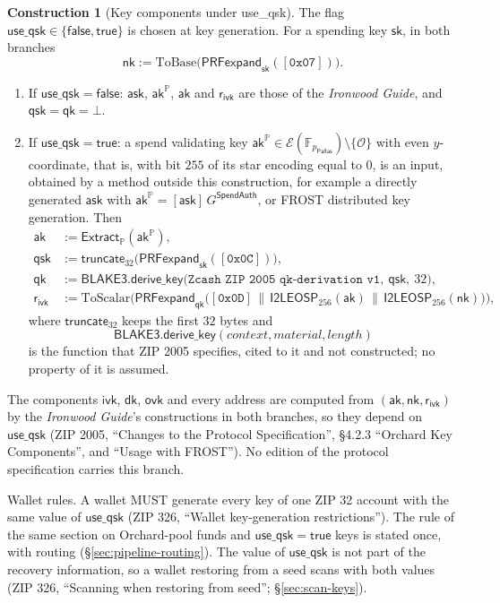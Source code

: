 \documentclass[11pt,a4paper]{article}
\theoremstyle{definition}
\newtheorem{construction}[theorem]{Construction}
\newcommand{\F}{\mathbb{F}}
\newcommand{\PP}{\mathbb{P}}
\newcommand{\Pallas}{\ensuremath{\mathsf{Pallas}}}
\newcommand{\Ep}{\ensuremath{\mathcal{E}}}
\newcommand{\Extract}{\ensuremath{\mathsf{Extract}}}
\newcommand{\ask}{\ensuremath{\mathsf{ask}}}
\newcommand{\aksym}{\ensuremath{\mathsf{ak}}}
\newcommand{\nksym}{\ensuremath{\mathsf{nk}}}
\newcommand{\ivk}{\ensuremath{\mathsf{ivk}}}
\newcommand{\ovk}{\ensuremath{\mathsf{ovk}}}
\newcommand{\dk}{\ensuremath{\mathsf{dk}}}
\newcommand{\rivk}{\ensuremath{\mathsf{r_{ivk}}}}
\begin{document}
\begin{construction}[Key components under use\_qsk]\label{def:zip32-useqsk}
The flag $\mathsf{use\_qsk} \in \{\mathsf{false}, \mathsf{true}\}$ is chosen
at key generation. For a spending key $\mathsf{sk}$, in both branches
\[
  \nksym := \mathrm{ToBase}\bigl(\mathsf{PRFexpand}_{\mathsf{sk}}
    ([\mathtt{0x07}])\bigr).
\]
\begin{enumerate}
\item If $\mathsf{use\_qsk} = \mathsf{false}$: $\ask$, $\aksym^{\PP}$,
  $\aksym$ and $\rivk$ are those of the \emph{Ironwood Guide}, and
  $\mathsf{qsk} = \mathsf{qk} = \bot$.
\item If $\mathsf{use\_qsk} = \mathsf{true}$: a spend validating key
  $\aksym^{\PP} \in \Ep(\F_{p_{\Pallas}}) \setminus \{\mathcal{O}\}$ with
  even $y$-coordinate, that is, with bit $255$ of its star encoding equal to
  $0$, is an input, obtained by a method outside this construction, for
  example a directly generated $\ask$ with
  $\aksym^{\PP} = [\ask]\,G^{\mathsf{SpendAuth}}$, or FROST distributed key
  generation. Then
  \begin{align*}
    \aksym &:= \Extract_{\PP}(\aksym^{\PP}), \\
    \mathsf{qsk} &:= \mathsf{truncate}_{32}\bigl(
      \mathsf{PRFexpand}_{\mathsf{sk}}([\mathtt{0x0C}])\bigr), \\
    \mathsf{qk} &:= \mathsf{BLAKE3.derive\_key}\bigl(
      \texttt{Zcash ZIP 2005 qk-derivation v1},\ \mathsf{qsk},\ 32\bigr), \\
    \rivk &:= \mathrm{ToScalar}\bigl(\mathsf{PRFexpand}_{\mathsf{qk}}\bigl(
      [\mathtt{0x0D}] \,\|\, \mathsf{I2LEOSP}_{256}(\aksym) \,\|\,
      \mathsf{I2LEOSP}_{256}(\nksym)\bigr)\bigr),
  \end{align*}
  where $\mathsf{truncate}_{32}$ keeps the first $32$ bytes and
  \[
    \mathsf{BLAKE3.derive\_key}(\mathit{context}, \mathit{material},
    \mathit{length})
  \]
  is the function that ZIP 2005 specifies, cited to it and
  not constructed; no property of it is assumed.
\end{enumerate}
The components $\ivk$, $\dk$, $\ovk$ and every address are computed from
$(\aksym, \nksym, \rivk)$ by the \emph{Ironwood Guide}'s constructions in
both branches, so they depend on $\mathsf{use\_qsk}$ (ZIP 2005, ``Changes to
the Protocol Specification'', \S 4.2.3 ``Orchard Key Components'', and
``Usage with FROST''). No edition of the protocol specification carries
this branch.

Wallet rules. A wallet MUST generate every key of one ZIP 32 account with
the same value of $\mathsf{use\_qsk}$ (ZIP 326, ``Wallet key-generation
restrictions''). The rule of the same section on Orchard-pool funds and
$\mathsf{use\_qsk} = \mathsf{true}$ keys is stated once, with routing
(\S\ref{sec:pipeline-routing}). The value of $\mathsf{use\_qsk}$ is not part
of the recovery information, so a wallet restoring from a seed scans with
both values (ZIP 326, ``Scanning when restoring from seed'';
\S\ref{sec:scan-keys}).


\end{construction}
\end{document}
